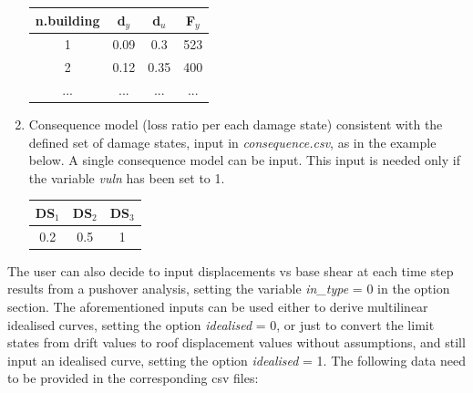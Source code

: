 \begin{enumerate}
\begin{table}[!htbp]
\centering
\begin{tabular}{|c|c|c|c|} \hline
\textbf{n.building} & \textbf{d$_y$} & \textbf{d$_u$} & \textbf{F$_y$} \\ \hline
1 & 0.09	& 0.3	 & 523\\ \hline
2 & 0.12	& 0.35	 & 400\\ \hline
... & ...	& ... & ...\\ \hline
\end{tabular}
\end{table}

\item Consequence model (loss ratio per each damage state) consistent with the defined set of damage states, input in \textit{consequence.csv}, as in the example below. A single consequence model can be input. This input is needed only if the variable \textit{vuln} has been set to 1.	
	\begin{table}[!htbp]
	\centering
	\begin{tabular}{|c|c|c|} \hline
	\textbf{DS$_1$} & \textbf{DS$_2$} & \textbf{DS$_3$} \\ \hline
	0.2	& 0.5	 & 1\\ \hline
	\end{tabular}
	\end{table}
	
\end{enumerate}

The user can also decide to input displacements vs base shear at each time step results from a pushover analysis, setting the variable \textit{in\_type} = 0 in the option section. The aforementioned inputs can be used either to derive multilinear idealised curves, setting the option \textit{idealised} = 0, or just to convert the limit states from drift values to roof displacement values without assumptions, and still input an idealised curve, setting the option \textit{idealised} = 1. The following data need to be provided in the corresponding csv files:


